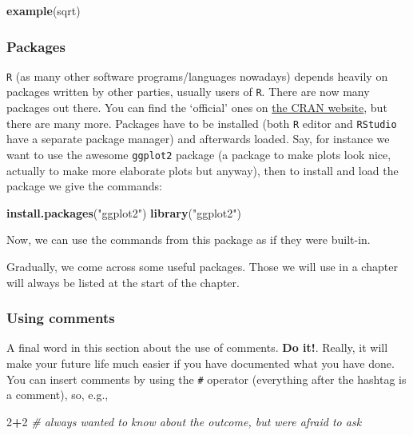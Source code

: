 \documentclass[]{article}
\newenvironment{Shaded}{\begin{snugshade}}{\end{snugshade}}
\newcommand{\KeywordTok}[1]{\textcolor[rgb]{0.13,0.29,0.53}{\textbf{#1}}}
\newcommand{\DecValTok}[1]{\textcolor[rgb]{0.00,0.00,0.81}{#1}}
\newcommand{\StringTok}[1]{\textcolor[rgb]{0.31,0.60,0.02}{#1}}
\newcommand{\CommentTok}[1]{\textcolor[rgb]{0.56,0.35,0.01}{\textit{#1}}}
\newcommand{\OperatorTok}[1]{\textcolor[rgb]{0.81,0.36,0.00}{\textbf{#1}}}
\newcommand{\NormalTok}[1]{#1}
\theoremstyle{definition}
\theoremstyle{definition}
\theoremstyle{definition}
\theoremstyle{remark}
\begin{document}
\begin{Shaded}
\begin{Highlighting}[]
\KeywordTok{example}\NormalTok{(sqrt)}
\end{Highlighting}
\end{Shaded}

\subsubsection{Packages}\label{subsec:packages}

\texttt{R} (as many other software programs/languages nowadays) depends
heavily on packages written by other parties, usually users of
\texttt{R}. There are now many packages out there. You can find the
`official' ones on
\href{https://cran.r-project.org/web/packages/available_packages_by_name.html}{the
CRAN website}, but there are many more. Packages have to be installed
(both \texttt{R} editor and \texttt{RStudio} have a separate package
manager) and afterwards loaded. Say, for instance we want to use the
awesome \texttt{ggplot2} package (a package to make plots look nice,
actually to make more elaborate plots but anyway), then to install and
load the package we give the commands:

\begin{Shaded}
\begin{Highlighting}[]
\KeywordTok{install.packages}\NormalTok{(}\StringTok{"ggplot2"}\NormalTok{)}
\KeywordTok{library}\NormalTok{(}\StringTok{"ggplot2"}\NormalTok{)}
\end{Highlighting}
\end{Shaded}

Now, we can use the commands from this package as if they were built-in.

Gradually, we come across some useful packages. Those we will use in a
chapter will always be listed at the start of the chapter.

\subsubsection{Using comments}\label{using-comments}

A final word in this section about the use of comments. \textbf{Do it!}.
Really, it will make your future life much easier if you have documented
what you have done. You can insert comments by using the \texttt{\#}
operator (everything after the hashtag is a comment), so, e.g.,

\begin{Shaded}
\begin{Highlighting}[]
\DecValTok{2}\OperatorTok{+}\DecValTok{2} \CommentTok{# always wanted to know about the outcome, but were afraid to ask}
\end{Highlighting}
\end{Shaded}
\end{document}
